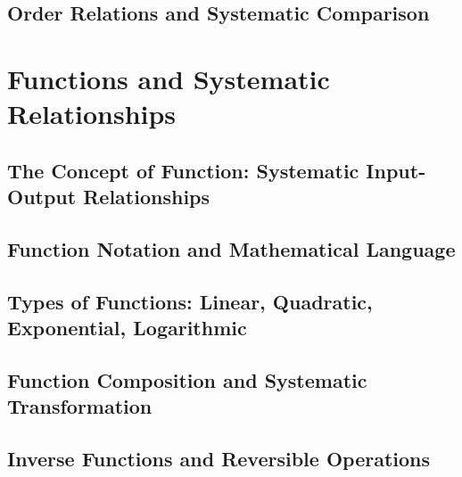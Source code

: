 \documentclass[12pt, oneside, openany]{book}
\let\oldchapter\chapter
\renewcommand{\chapter}{
	\cleardoublepage
	\thispagestyle{chapter}
	\oldchapter
}
\begin{document}
\section{Order Relations and Systematic Comparison}


\chapter{Functions and Systematic Relationships}

\section{The Concept of Function: Systematic Input-Output Relationships}

\section{Function Notation and Mathematical Language}

\section{Types of Functions: Linear, Quadratic, Exponential, Logarithmic}

\section{Function Composition and Systematic Transformation}

\section{Inverse Functions and Reversible Operations}
\end{document}
